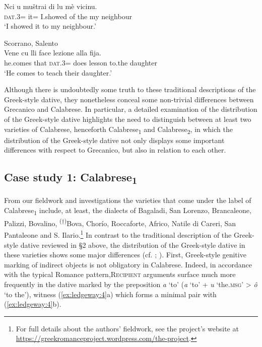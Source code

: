 \documentclass[output=paper,modfonts,nonflat,colorlinks,citecolor=brown]{langsci/langscibook}
\begin{document}
\ex
	\gll Nci  u  muštrai  di  lu  mè  vicinu.\\
    \textsc{dat}.3=  it=  I.showed  of  the  my  neighbour\\
    \glt `I showed it to my neighbour.'
\z
\z

\ea\label{ex:ledgeway:3}
Scorrano, Salento\\
\gll Vene  cu  lli  face  lezione  alla  fija.\\
he.comes  that  \textsc{dat}.3=  does  lesson  to.the  daughter\\
\glt `He comes to teach their daughter.'
\z

Although there is undoubtedly some truth to these traditional descriptions of the Greek-style dative, they nonetheless conceal some non-trivial differences between Grecanico and Calabrese. In particular, a detailed examination of the distribution of the Greek-style dative highlights the need to distinguish between at least two varieties of Calabrese, henceforth Calabrese\textsubscript{1} and Calabrese\textsubscript{2}, in which the distribution of the Greek-style dative not only displays some important differences with respect to Grecanico, but also in relation to each other.

\subsection{Case study 1: Calabrese\textsubscript{1}}

From our fieldwork and investigations the varieties that come under the label of Calabrese\textsubscript{1} include, at least, the dialects of Bagaladi, San Lorenzo, Brancaleone, Palizzi, Bovalino, \textsuperscript{(†)}Bova, Chorío, Roccaforte, Africo, Natile di Careri, San Pantaleone and S. Ilario.\footnote{For full details about the authors’ fieldwork, see the project’s website at \url{https://greekromanceproject.wordpress.com/the-project}.} In contrast to the traditional description of the Greek-style dative reviewed in §2 above, the distribution of the Greek-style dative in these varieties shows some major differences (cf. \citealt{Trumper2003}; \citealt[193-196]{Ledgeway2013}). First, Greek-style genitive marking of indirect objects is not obligatory in Calabrese. Indeed, in accordance with the typical Romance pattern,\textsc{Recipient} arguments surface much more frequently in the dative marked by the preposition \textit{a} ‘to’ (\textit{a} ‘to’ + \textit{u} ‘the.\textsc{msg}’ > \textit{ô} ‘to the’), witness (\ref{ex:ledgeway:4}a) which forms a minimal pair with (\ref{ex:ledgeway:4}b).
\end{document}
